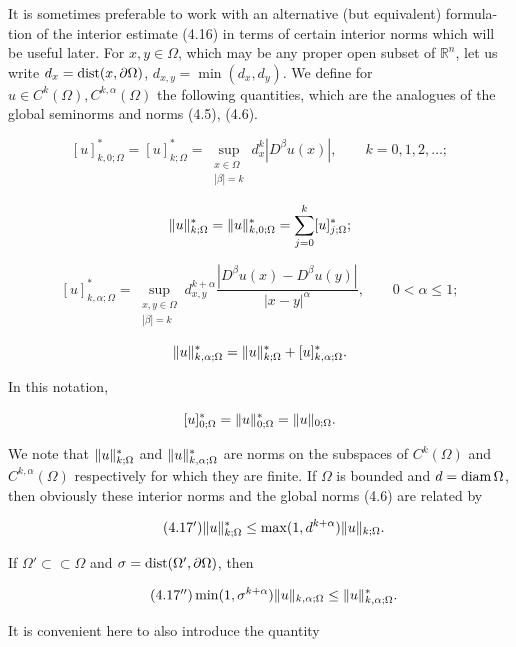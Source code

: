 \medskip

\noindent
It is sometimes preferable to work with an alternative (but equivalent) formula-
tion of the interior estimate (4.16) in terms of certain interior norms which will
be useful later. For $x, y \in \Omega$, which may be any proper open subset of $\mathbb{R}^n$, let
us write $d_x=\operatorname{dist}(x,\partial\Omega)$, $d_{x,y}=\min(d_x,d_y)$. We define for $u\in C^k(\Omega), C^{k,\alpha}(\Omega)$
the following quantities, which are the analogues of the global seminorms and
norms (4.5), (4.6).

\[
[u]^*_{k,0;\Omega}=[u]^*_{k;\Omega}=\sup_{\substack{x\in\Omega\\ |\beta|=k}} d_x^k|D^\beta u(x)|,\qquad k=0,1,2,\ldots;
\]

\[
\lVert u\rVert^*_{k;\Omega}=\lVert u\rVert^*_{k,0;\Omega}=\sum_{j=0}^k [u]^*_{j;\Omega};
\]

\begin{equation}\tag{4.17}
[u]^*_{k,\alpha;\Omega}=\sup_{\substack{x,y\in\Omega\\ |\beta|=k}} d_{x,y}^{k+\alpha}\frac{|D^\beta u(x)-D^\beta u(y)|}{|x-y|^\alpha},
\qquad 0<\alpha\leq 1;
\end{equation}

\[
\lVert u\rVert^*_{k,\alpha;\Omega}=\lVert u\rVert^*_{k;\Omega}+[u]^*_{k,\alpha;\Omega}.
\]

\noindent
In this notation,

\[
[u]^*_{0;\Omega}=\lVert u\rVert^*_{0;\Omega}=\lVert u\rVert_{0;\Omega}.
\]

\noindent
We note that $\lVert u\rVert^*_{k;\Omega}$ and $\lVert u\rVert^*_{k,\alpha;\Omega}$ are norms on the subspaces of $C^k(\Omega)$ and $C^{k,\alpha}(\Omega)$
respectively for which they are finite. If $\Omega$ is bounded and $d=\operatorname{diam} \Omega$, then obviously
these interior norms and the global norms (4.6) are related by

\begin{equation}\tag{4.17$'$}
\lVert u\rVert^*_{k;\Omega}\leq \max(1,d^{k+\alpha})\lVert u\rVert_{k;\Omega}.
\end{equation}

\noindent
If $\Omega' \subset\subset \Omega$ and $\sigma=\operatorname{dist}(\Omega',\partial\Omega)$, then

\begin{equation}\tag{4.17$''$}
\min(1,\sigma^{k+\alpha})\lVert u\rVert_{k,\alpha;\Omega}\leq \lVert u\rVert^*_{k,\alpha;\Omega}.
\end{equation}

\noindent
It is convenient here to also introduce the quantity


